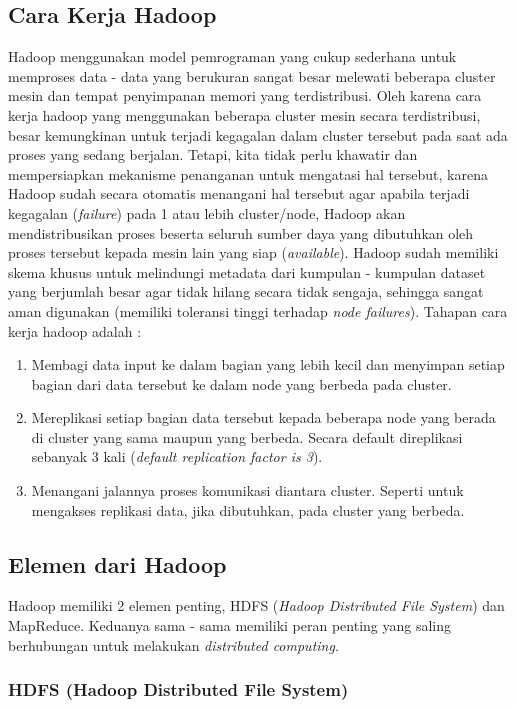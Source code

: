 	\subsection{Cara Kerja Hadoop}
	Hadoop menggunakan model pemrograman yang cukup sederhana untuk memproses data - data yang berukuran sangat besar melewati beberapa cluster mesin dan tempat penyimpanan memori yang terdistribusi. Oleh karena cara kerja hadoop yang menggunakan beberapa cluster mesin secara terdistribusi, besar kemungkinan untuk terjadi kegagalan dalam cluster tersebut pada saat ada proses yang sedang berjalan. Tetapi, kita tidak perlu khawatir dan mempersiapkan mekanisme penanganan untuk mengatasi hal tersebut, karena Hadoop sudah secara otomatis menangani hal tersebut agar apabila terjadi kegagalan (\textit{failure}) pada 1 atau lebih cluster/node, Hadoop akan mendistribusikan proses beserta seluruh sumber daya yang dibutuhkan oleh proses tersebut kepada mesin lain yang siap (\textit{available}). Hadoop sudah memiliki skema khusus untuk melindungi metadata dari kumpulan - kumpulan dataset yang berjumlah besar agar tidak hilang secara tidak sengaja, sehingga sangat aman digunakan (memiliki toleransi tinggi terhadap \textit{node failures}). Tahapan cara kerja hadoop adalah \cite{Holmes:2012:HP:2543981} : 
	\begin{enumerate}
		\item Membagi data input ke dalam bagian yang lebih kecil dan menyimpan setiap bagian dari data tersebut ke dalam node yang berbeda pada cluster.
		\item Mereplikasi setiap bagian data tersebut kepada beberapa node yang berada di cluster yang sama maupun yang berbeda. Secara default direplikasi sebanyak 3 kali (\textit{default replication factor is 3}).
		\item Menangani jalannya proses komunikasi diantara cluster. Seperti untuk mengakses replikasi data, jika dibutuhkan, pada cluster yang berbeda.
	\end{enumerate}
	\subsection{Elemen dari Hadoop}
	Hadoop memiliki 2 elemen penting, HDFS (\textit{Hadoop Distributed File System}) dan MapReduce. Keduanya sama - sama memiliki peran penting yang saling berhubungan untuk melakukan \textit{distributed computing}.
		\subsubsection{HDFS (Hadoop Distributed File System)}

